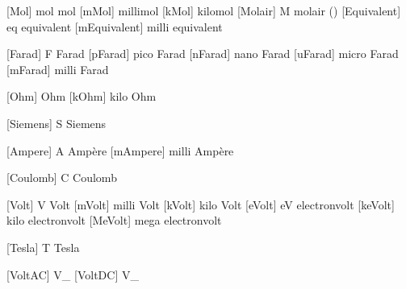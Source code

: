 
 [Mol]         {mol}                {mol}
 [mMol]        {\Milli \Mol}        {millimol}
 [kMol]        {\Kilo  \Mol}        {kilomol}
 [Molair]      {M}                  {molair (\Mol \Per \Liter)}
 [Equivalent]  {eq}                 {equivalent}
 [mEquivalent] {\Milli \Equivalent} {milli equivalent}


 [Farad]   {F}             {Farad}
 [pFarad]  {\Pico  \Farad} {pico Farad}
 [nFarad]  {\Nano  \Farad} {nano Farad}
 [uFarad]  {\Micro \Farad} {micro Farad}
 [mFarad]  {\Milli \Farad} {milli Farad}

 [Ohm]     {\Omega}        {Ohm}
 [kOhm]    {\Kilo \Ohm}    {kilo Ohm}

 [Siemens] {S}              {Siemens}

 [Ampere]  {A}              {Amp\`ere}
 [mAmpere] {\Milli \Ampere} {milli Amp\`ere}

 [Coulomb] {C}              {Coulomb}

 [Volt]    {V}              {Volt}
 [mVolt]   {\Milli \Volt}   {milli Volt}
 [kVolt]   {\Kilo  \Volt}   {kilo Volt}
 [eVolt]   {eV}             {electronvolt}
 [keVolt]  {\Kilo \eVolt}   {kilo electronvolt}
 [MeVolt]  {\Mega \eVolt}   {mega electronvolt}

 [Tesla]   {T}              {Tesla}

 [VoltAC]  {V_{}}  {}
 [VoltDC]  {V_{}}  {}

\setuplabeltext
  [\s!nl]
  [u:vac=wisselspanning,
   u:vdc=gelijkspanning]

\setuplabeltext
  [\s!en]
  [u:vac=alternating current,
   u:vdc=direct current]

\setuplabeltext
  [\s!de]
  [u:vac=Wechselspannung,
   u:vdc=Gleichspannung]

\setuplabeltext
  [\s!it]
  [u:vac=corrente alternata,
   u:vdc=corrente continua]

